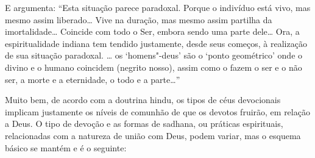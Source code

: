 E argumenta: ``Esta situação parece paradoxal. Porque o indivíduo está
vivo, mas mesmo assim liberado\ldots{} Vive na duração, mas mesmo assim
partilha da imortalidade\ldots{} Coincide com todo o Ser, embora sendo uma
parte dele\ldots{} Ora, a espiritualidade indiana tem tendido justamente,
desde seus começos, à realização de sua situação paradoxal. \ldots{} os
`homens"-deus' são o `ponto geométrico' onde o divino e o humano
coincidem (negrito nosso), assim como o fazem o ser e o não ser, a morte
e a eternidade, o todo e a parte\ldots{}''

Muito bem, de acordo com a doutrina hindu, os tipos de céus devocionais
implicam justamente os níveis de comunhão de que os devotos fruirão, em
relação a Deus. O tipo de devoção e as formas de sadhana, ou práticas
espirituais, relacionadas com a natureza de união com Deus, podem
variar, mas o esquema básico se mantém e é o seguinte:

